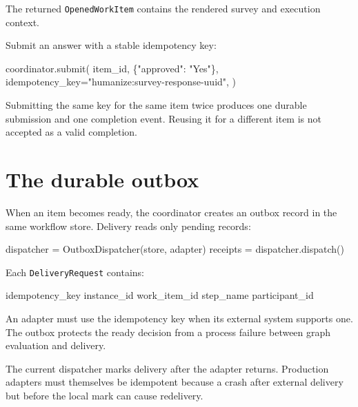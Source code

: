 \documentclass[
  10pt,
]{report}
\newenvironment{Shaded}{}{}
\newcommand{\NormalTok}[1]{#1}
\newcommand{\OperatorTok}[1]{\textcolor[rgb]{0.40,0.40,0.40}{#1}}
\newcommand{\StringTok}[1]{\textcolor[rgb]{0.25,0.44,0.63}{#1}}
\begin{document}
The returned \texttt{OpenedWorkItem} contains the rendered survey and
execution context.

Submit an answer with a stable idempotency key:

\begin{Shaded}
\begin{Highlighting}[]
\NormalTok{coordinator.submit(}
\NormalTok{    item\_id,}
\NormalTok{    \{}\StringTok{"approved"}\NormalTok{: }\StringTok{"Yes"}\NormalTok{\},}
\NormalTok{    idempotency\_key}\OperatorTok{=}\StringTok{"humanize:survey{-}response{-}uuid"}\NormalTok{,}
\NormalTok{)}
\end{Highlighting}
\end{Shaded}

Submitting the same key for the same item twice produces one durable
submission and one completion event. Reusing it for a different item is
not accepted as a valid completion.

\chapter{The durable outbox}\label{the-durable-outbox}

When an item becomes ready, the coordinator creates an outbox record in
the same workflow store. Delivery reads only pending records:

\begin{Shaded}
\begin{Highlighting}[]
\NormalTok{dispatcher }\OperatorTok{=}\NormalTok{ OutboxDispatcher(store, adapter)}
\NormalTok{receipts }\OperatorTok{=}\NormalTok{ dispatcher.dispatch()}
\end{Highlighting}
\end{Shaded}

Each \texttt{DeliveryRequest} contains:

\begin{Shaded}
\begin{Highlighting}[]
\NormalTok{idempotency\_key}
\NormalTok{instance\_id}
\NormalTok{work\_item\_id}
\NormalTok{step\_name}
\NormalTok{participant\_id}
\end{Highlighting}
\end{Shaded}

An adapter must use the idempotency key when its external system
supports one. The outbox protects the ready decision from a process
failure between graph evaluation and delivery.

The current dispatcher marks delivery after the adapter returns.
Production adapters must themselves be idempotent because a crash after
external delivery but before the local mark can cause redelivery.
\end{document}
